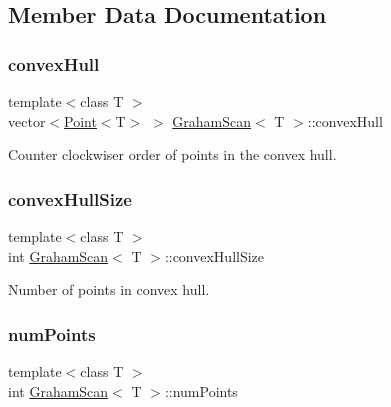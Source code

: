 \subsection{Member Data Documentation}
\mbox{\label{classGrahamScan_a7d93b90073f5d60d142f8470ac8bf714}} 
\subsubsection{\texorpdfstring{convex\+Hull}{convexHull}}
{\footnotesize\ttfamily template$<$class T $>$ \\
vector$<$\mbox{\hyperlink{classPoint}{Point}}$<$T$>$ $>$ \mbox{\hyperlink{classGrahamScan}{Graham\+Scan}}$<$ T $>$\+::convex\+Hull\hspace{0.3cm}{\ttfamily [private]}}



Counter clockwiser order of points in the convex hull. 

\mbox{\label{classGrahamScan_a5d428a11cebb2ff2f9e91d2644d7d0c5}} 
\subsubsection{\texorpdfstring{convex\+Hull\+Size}{convexHullSize}}
{\footnotesize\ttfamily template$<$class T $>$ \\
int \mbox{\hyperlink{classGrahamScan}{Graham\+Scan}}$<$ T $>$\+::convex\+Hull\+Size\hspace{0.3cm}{\ttfamily [private]}}



Number of points in convex hull. 

\mbox{\label{classGrahamScan_a4769bbdb7caacde8c368a0074fccef19}} 
\subsubsection{\texorpdfstring{num\+Points}{numPoints}}
{\footnotesize\ttfamily template$<$class T $>$ \\
int \mbox{\hyperlink{classGrahamScan}{Graham\+Scan}}$<$ T $>$\+::num\+Points\hspace{0.3cm}{\ttfamily [private]}}



